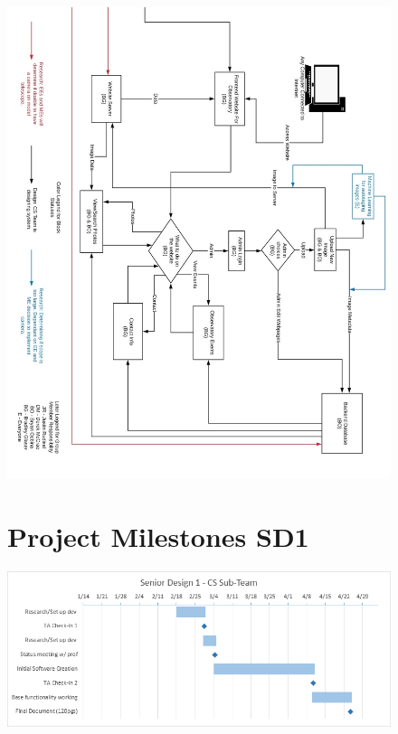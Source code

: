 \documentclass[12pt]{report}
\begin{document}
\begin{figure}
	\centering
	\includegraphics[height=\textheight,width=\linewidth]{blockpt1}
\end{figure}

\newpage %

\begin{figure}
	\section*{Project Milestones SD1}
	\includegraphics[width=\linewidth]{SD1Gantt}
\end{figure}
\end{document}
